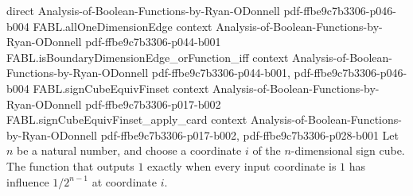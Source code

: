 \begin{theorem}
  {direct}
  {Analysis-of-Boolean-Functions-by-Ryan-ODonnell}
  {pdf-ffbe9c7b3306-p046-b004}
\proofstep
  {FABL.allOneDimensionEdge}
  {context}
  {Analysis-of-Boolean-Functions-by-Ryan-ODonnell}
  {pdf-ffbe9c7b3306-p044-b001}
\proofstep
  {FABL.isBoundaryDimensionEdge_orFunction_iff}
  {context}
  {Analysis-of-Boolean-Functions-by-Ryan-ODonnell}
  {pdf-ffbe9c7b3306-p044-b001,
    pdf-ffbe9c7b3306-p046-b004}
\proofstep
  {FABL.signCubeEquivFinset}
  {context}
  {Analysis-of-Boolean-Functions-by-Ryan-ODonnell}
  {pdf-ffbe9c7b3306-p017-b002}
\proofstep
  {FABL.signCubeEquivFinset_apply_card}
  {context}
  {Analysis-of-Boolean-Functions-by-Ryan-ODonnell}
  {pdf-ffbe9c7b3306-p017-b002,
    pdf-ffbe9c7b3306-p028-b001}
Let $n$ be a natural number, and choose a coordinate $i$ of the $n$-dimensional sign
cube. The function that outputs $1$ exactly when every input coordinate is $1$ has
influence $1/2^{n-1}$ at coordinate $i$.
\end{theorem}

